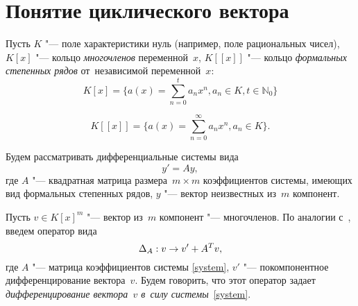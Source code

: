 \section{Понятие циклического вектора}

Пусть $K$ "--- поле характеристики нуль (например, поле рациональных чисел),
$K[x]$ "--- кольцо \emph{многочленов} переменной~$x$,
$K[[x]]$ "--- кольцо \emph{формальных степенных рядов} от~независимой переменной~$x$:
\[
	K[x] = \{a(x) = \sum\limits_{n = 0}^t a_n x^n, a_n \in K, t \in \mathbb{N}_0\}
\]

\[
	K[[x]] = \{a(x) = \sum\limits_{n = 0}^\infty a_n x^n, a_n \in K\}.
\]
\medskip

Будем рассматривать дифференциальные системы вида
\begin{equation}
	y' = Ay,
	\label{system}
\end{equation}
где $A$ "--- квадратная матрица размера~$m \times m$ коэффициентов системы, имеющих вид формальных степенных рядов,
$y$ "--- вектор неизвестных из~$m$ компонент.

Пусть $v \in K[x]^m$ "--- вектор из~$m$ компонент "--- многочленов. По аналогии с~\cite{litVanDerPut}, введем оператор вида
\begin{equation}
    \text{$ \Delta_A $}: v\rightarrow v' + A^T v,
    \label{differention}
\end{equation}
где $A$ "--- матрица коэффициентов системы \eqref{system}, $v'$ "--- покомпонентное дифференцирование вектора~$v$.
Будем говорить, что этот оператор задает \emph{дифференцирование вектора~$v$ в~силу системы}~\eqref{system}.

